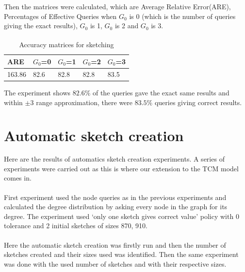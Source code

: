\documentclass[12pt]{report}
\numberwithin{figure}{section}
\numberwithin{table}{section}
\begin{document}
Then the matrices were calculated, which are Average Relative Error(ARE), Percentages of Effective Queries when $G_0$ is 0 (which is the number of queries giving the exact results), $G_0$ is 1, $G_0$ is 2 and $G_0$ is 3.

\paragraph{}

\begin{table}[H]
\centering
\begin{tabular}{|l|l|l|l|l|}
\hline
 ARE   & $G_0$=0 & $G_0$=1 & $G_0$=2 & $G_0$=3 \\ \hline
163.86 &   82.6  &   82.8  &   82.8  &   83.5  \\ \hline
\end{tabular}
\caption{Accuracy matrices for sketching}
\end{table}


The experiment shows $82.6\%$ of the queries gave the exact same results and within $\pm3$ range approximation, there were $83.5\%$ queries giving correct results.

\section{Automatic sketch creation}
Here are the results of automatics sketch creation experiments. A series of experiments were carried out as this is where our extension to the TCM model comes in. 

\paragraph{}

First experiment used the node queries as in the previous experiments and calculated the degree distribution by asking every node in the graph for its degree. The experiment used ‘only one sketch gives correct value’ policy with 0 tolerance and 2 initial sketches of sizes 870, 910.

\paragraph{}

Here the automatic sketch creation was firstly run and then the number of sketches created and their sizes used was identified. Then the same experiment was done with the used number of sketches and with their respective sizes. 
\end{document}
